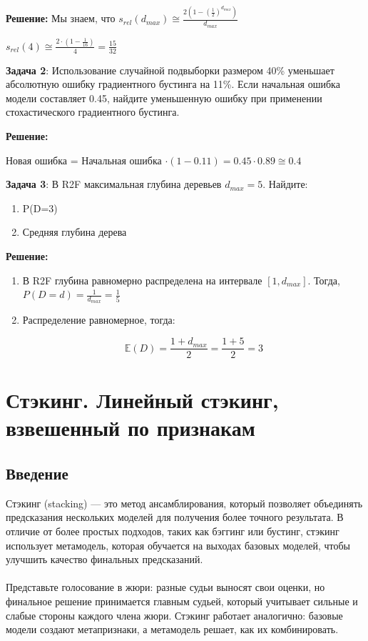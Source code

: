 \textbf{Решение:}
Мы знаем, что $s_{rel}(d_{max})\cong\frac{2 \left(1-\left(\frac{1}{2}\right)^{d_{max}}\right)}{d_{max}}$

$s_{rel}(4) \cong \frac{2 \cdot (1 - \frac{1}{16})}{4} = \frac{15}{32}$

\textbf{Задача 2}:
Использование случайной подвыборки размером 40\% уменьшает абсолютную ошибку градиентного бустинга на 11\%. Если начальная ошибка модели составляет 0.45, найдите уменьшенную ошибку при применении стохастического градиентного бустинга.

\textbf{Решение:}
\begin{center}    
Новая ошибка = Начальная ошибка $\cdot (1 - 0.11) = 0.45 \cdot 0.89 \cong 0.4$
\end{center}

\textbf{Задача 3}:
В R2F максимальная глубина деревьев $d_{max} = 5$. Найдите:
\begin{enumerate}
    \item P(D=3)
    \item Средняя глубина дерева
\end{enumerate}

\textbf{Решение:}
\begin{enumerate}
    \item 
    В R2F глубина равномерно распределена на интервале $[1, d_{max}]$.
    Тогда, $P(D=d) = \frac{1}{d_{max}} = \frac{1}{5}$

    \item 
    Распределение равномерное, тогда:

    $$\mathbb{E}(D) = \frac{1 + d_{max}}{2} = \frac{1 + 5}{2} = 3$$
\end{enumerate}


\section*{Стэкинг. Линейный стэкинг, взвешенный по признакам}

\subsection*{Введение}

Стэкинг (stacking) — это метод ансамблирования, который позволяет объединять предсказания нескольких моделей для получения более точного результата. В отличие от более простых подходов, таких как бэггинг или бустинг, стэкинг использует метамодель, которая обучается на выходах базовых моделей, чтобы улучшить качество финальных предсказаний.
\\
\\
Представьте голосование в жюри: разные судьи выносят свои оценки, но финальное решение принимается главным судьей, который учитывает сильные и слабые стороны каждого члена жюри. Стэкинг работает аналогично: базовые модели создают метапризнаки, а метамодель решает, как их комбинировать.

